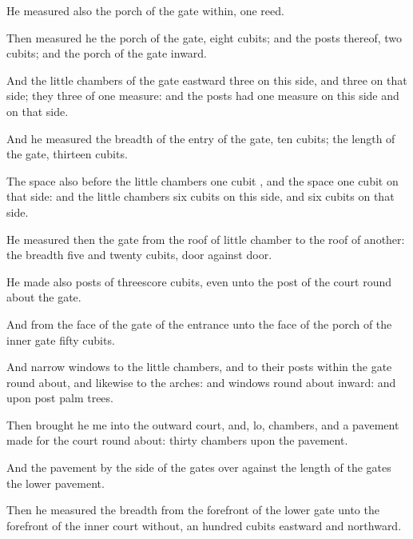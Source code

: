 {He
measured also the
porch of the
gate
within,
one
reed.

Then
measured he the
porch of the
gate,
eight
cubits; and the
posts thereof,
two
cubits; and the
porch of the
gate
{}
inward.

And the little
chambers of the
gate
eastward
{}
three on this
side, and
three on that
side; they
three
{} of
one
measure: and the
posts had
one
measure on this side and on that side.

And he
measured the
breadth of the
entry of the
gate,
ten
cubits;
{} the
length of the
gate,
thirteen
cubits.

The
space also
before the little
chambers
{}
one
cubit
{}, and the
space
{} one
cubit on that side: and the little
chambers
{}
six
cubits on this side, and
six
cubits on that side.

He
measured then the
gate from the
roof of
{} little
chamber to the
roof of another: the
breadth
{}
five and
twenty
cubits,
door against
door.

He
made also
posts of
threescore
cubits, even unto the
post of the
court round
about the
gate.

And from the
face of the
gate of the
entrance unto the
face of the
porch of the
inner
gate
{}
fifty
cubits.

And
{}
narrow
windows to the little
chambers, and to their
posts
within the
gate round
about, and likewise to the
arches: and
windows
{} round
about
inward: and upon
{}
post
{} palm
trees.

Then
brought he me into the
outward
court, and, lo,
{}
chambers, and a
pavement
made for the
court round
about:
thirty
chambers
{} upon the
pavement.

And the
pavement by the
side of the
gates over
against the
length of the
gates
{} the
lower
pavement.

Then he
measured the
breadth from the
forefront of the
lower
gate unto the
forefront of the
inner
court
without, an
hundred
cubits
eastward and
northward.


}
